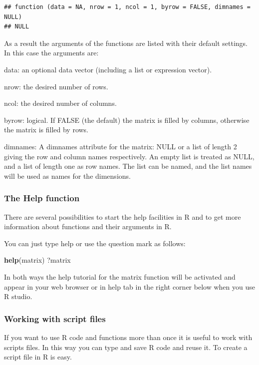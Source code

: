 \documentclass[]{book}
\newenvironment{Shaded}{\begin{snugshade}}{\end{snugshade}}
\newcommand{\KeywordTok}[1]{\textcolor[rgb]{0.13,0.29,0.53}{\textbf{#1}}}
\newcommand{\NormalTok}[1]{#1}
\theoremstyle{definition}
\theoremstyle{definition}
\theoremstyle{definition}
\theoremstyle{remark}
\begin{document}
\begin{verbatim}
## function (data = NA, nrow = 1, ncol = 1, byrow = FALSE, dimnames = NULL) 
## NULL
\end{verbatim}

As a result the arguments of the functions are listed with their default
settings. In this case the arguments are:

data: an optional data vector (including a list or expression vector).

nrow: the desired number of rows.

ncol: the desired number of columns.

byrow: logical. If FALSE (the default) the matrix is filled by columns,
otherwise the matrix is filled by rows.

dimnames: A dimnames attribute for the matrix: NULL or a list of length
2 giving the row and column names respectively. An empty list is treated
as NULL, and a list of length one as row names. The list can be named,
and the list names will be used as names for the dimensions.

\subsubsection{The Help function}\label{the-help-function}

There are several possibilities to start the help facilities in R and to
get more information about functions and their arguments in R.

You can just type help or use the question mark as follows:

\begin{Shaded}
\begin{Highlighting}[]
\KeywordTok{help}\NormalTok{(matrix)}
\NormalTok{?matrix}
\end{Highlighting}
\end{Shaded}

In both ways the help tutorial for the matrix function will be activated
and appear in your web browser or in help tab in the right corner below
when you use R studio.

\subsubsection{Working with script
files}\label{working-with-script-files}

If you want to use R code and functions more than once it is useful to
work with scripts files. In this way you can type and save R code and
reuse it. To create a script file in R is easy.
\end{document}
